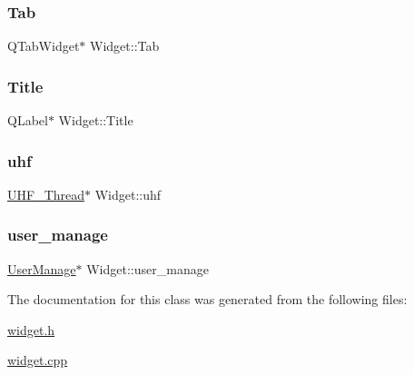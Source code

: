 \subsubsection{\texorpdfstring{Tab}{Tab}}
{\footnotesize\ttfamily Q\+Tab\+Widget$\ast$ Widget\+::\+Tab\hspace{0.3cm}{\ttfamily [private]}}

\mbox{\label{class_widget_a4ee54afb0ebf24cd30a1a1471118abe4}} 
\subsubsection{\texorpdfstring{Title}{Title}}
{\footnotesize\ttfamily Q\+Label$\ast$ Widget\+::\+Title\hspace{0.3cm}{\ttfamily [private]}}

\mbox{\label{class_widget_ae73de6c68cde3ec8fe6954c51407f57f}} 
\subsubsection{\texorpdfstring{uhf}{uhf}}
{\footnotesize\ttfamily \mbox{\hyperlink{class_u_h_f___thread}{U\+H\+F\+\_\+\+Thread}}$\ast$ Widget\+::uhf\hspace{0.3cm}{\ttfamily [private]}}

\mbox{\label{class_widget_ab5466d1d1f1c9e475eb86b2644af7e4b}} 
\subsubsection{\texorpdfstring{user\_manage}{user\_manage}}
{\footnotesize\ttfamily \mbox{\hyperlink{class_user_manage}{User\+Manage}}$\ast$ Widget\+::user\+\_\+manage\hspace{0.3cm}{\ttfamily [private]}}



The documentation for this class was generated from the following files\+:\begin{DoxyCompactItemize}
\item 
\mbox{\hyperlink{widget_8h}{widget.\+h}}\item 
\mbox{\hyperlink{widget_8cpp}{widget.\+cpp}}\end{DoxyCompactItemize}
